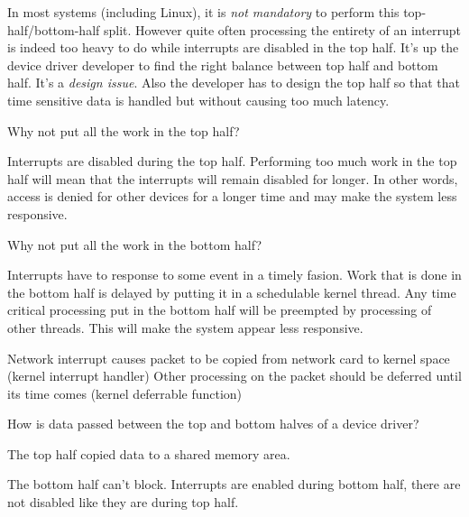 In most systems (including Linux), it is \textit{not mandatory} to perform this top-half/bottom-half 
split. However quite often processing the entirety of an interrupt is indeed 
too heavy to do while interrupts are disabled in the top half. 
It's up the device driver developer to find the right balance between 
top half and bottom half. It's a \textit{design issue}. Also the developer has to design the top half 
so that that time sensitive data is handled but without causing too much latency. 

\frmrule

\begin{example}
Why not put all the work in the top half?

Interrupts are disabled during the top half. Performing too much work in the top half 
will mean that the interrupts will remain disabled for longer. In other words, 
access is denied for other devices 
for a longer time and may make the system less responsive.
\end{example}

\frmrule

\begin{example}
Why not put all the work in the bottom half?

Interrupts have to response to some event in a timely fasion. Work that is done in the bottom 
half is delayed by putting it in a schedulable kernel thread. Any time critical processing put 
in the bottom half will be preempted by processing of other threads. 
This will make the system appear less responsive.
\end{example}

\frmrule

\begin{example}
Network interrupt causes packet to be copied from 
network card to kernel space (kernel interrupt handler)
Other processing on the packet should be deferred until 
its time comes (kernel deferrable function)
\end{example}


\begin{example}
How is data passed between the top and bottom halves of a device driver?

The top half copied data to a shared memory area.
\end{example}

\frmrule

The bottom half can’t block. 
Interrupts are enabled during bottom half, 
there are not disabled like they are during top half.

